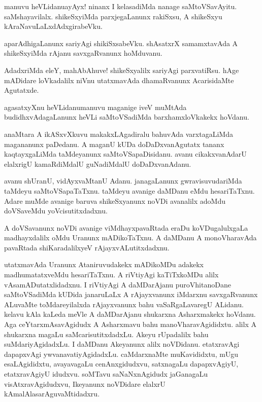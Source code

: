 \begin{mng}
manuvu heVLidanu\mdash ayAyx! ninanx I kelasadiMda nanage saMtoVSavAyitu. saMshayavilalx. shikeSxyiMda parxjegaLanunx rakiSxsu, A shikeSxyu kAraNavuLaLxdAdxgirabeVku.
\end{mng}

\begin{mng}
aparAdhigaLanunx sariyAgi shikiSxsabeVku. shAsatxrX samamxtavAda A shikeSxyiMda rAjanu savxgaRvanunx hoMduvanu.
\end{mng}

\begin{mng}
AdadxriMda eleY, mahAbAhuve! shikeSxyalilx sariyAgi parxvatiRsu. hAge mADidare loVkadalilx niVnu utatxmavAda dhamaRvanunx AcarisidaMte Agutatxde.
\end{mng}

\begin{mng}
agasatxyXnu heVLidanu\mdash manuvu maganige iveV muMtAda budidhxvAdagaLanunx heVLi saMtoVSadiMda barxhamxloVkakekx hoVdanu.
\end{mng}

\begin{mng}
anaMtara A ikASxvXkuvu makakxLAgadiralu bahuvAda varxtagaLiMda magananunx paDedanu. A maganU kUDa doDaDxvanAgutatx tananx kaqtayxgaLiMda taMdeyanunx saMtoVSapaDisidanu. avanu cikakxvanAdarU elalxrigU kamaRdiMdalU guNadiMdalU doDaDxvanAdanu.
\end{mng}

\begin{mng}
avanu shUranU, vidAyxvaMtanU Adanu. janagaLanunx gwravisuvudariMda taMdeyu saMtoVSapaTaTxnu. taMdeyu avanige daMDanu eMdu hesariTaTxnu. Adare muMde avanige baruva shikeSxyanunx noVDi avanalilx adoMdu doVSaveMdu yoVcisutitxdadxnu.
\end{mng}

\begin{mng}
A doVSavanunx noVDi avanige viMdhayxpavaRtada eraDu koVDugalulxgaLa madhayxdalilx oMdu Uranunx mADikoTaTxnu. A daMDanu A monoVharavAda pavaRtada shiKaradalilxyeV rAjayxvALutitxdadxnu.
\end{mng}

\begin{mng}
utatxmavAda Uranunx Ataniruvudakekx mADikoMDu adakekx madhumatatxveMdu hesariTaTxnu. A riVtiyAgi kaTiTxkoMDu alilx vAsamADutatxlidadxnu. I riVtiyAgi A daMDarAjanu puroVhitanoDane saMtoVSadiMda kUDida janaruLaLx A rAjayxvanunx iMdarxnu savxgaRvanunx ALuvaMte toMdareyilalxda rAjayxvanunx bahu vaSaRgaLavaregU ALidanu. kelavu kAla kaLeda meVle A daMDarAjanu shukarxna Asharxmakekx hoVdanu. Aga ceYtarxmAsavAgidudx A Asharxmavu bahu manoVharavAgididxtu. alilx A shukarxna magaLu saMcarisutitxdadxLu. Akeyu rUpadalilx bahu suMdariyAgidadxLu. I daMDanu Akeyanunx alilx noVDidanu. etatxravAgi dapapxvAgi ywvanavatiyAgidadxLu. caMdarxnaMte muKavididxtu, mUgu esaLAgididxtu, avayavagaLu cenAnxgidudxvu, satxnagaLu dapapxvAgiyU, etatxravAgiyU idudxvu. soMTavu saNaNxnAgidudx jaGanagaLu visAtxravAgidudxvu, Ikeyanunx noVDidare elalxrU kAmalAlasarAguvaMtidadxru.
\end{mng}

